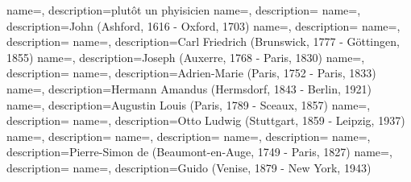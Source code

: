  {
    name=,
    description={plutôt un phyisicien}
}
 {
    name=,
    description={}
}
 {
    name=,
    description={John  (Ashford, 1616 - Oxford, 1703)}
}
 {
    name=,
    description={}
}
 {
    name=,
    description={}
}
 {
    name=,
    description={Carl Friedrich (Brunswick, 1777 - Göttingen, 1855)}
}
 {
    name=,
    description={Joseph (Auxerre, 1768 - Paris, 1830)}
}
 {
    name=,
    description={}
}
 {
    name=,
    description={Adrien-Marie (Paris, 1752 - Paris, 1833)}
}
 {
    name=,
    description={Hermann Amandus (Hermsdorf, 1843 - Berlin, 1921)}
}
 {
    name=,
    description={Augustin Louis (Paris, 1789 - Sceaux, 1857)}
}
 {
    name=,
    description={}
}
 {
    name=,
    description={Otto Ludwig (Stuttgart, 1859 - Leipzig, 1937)}
}
 {
    name=,
    description={}
}
 {
    name=,
    description={}
}
 {
    name=,
    description={}
}
 {
    name=,
    description={Pierre-Simon de (Beaumont-en-Auge, 1749 - Paris, 1827)}
}
 {
    name=,
    description={}
}
 {
    name=,
    description={Guido (Venise, 1879 - New York, 1943)}
}
    
